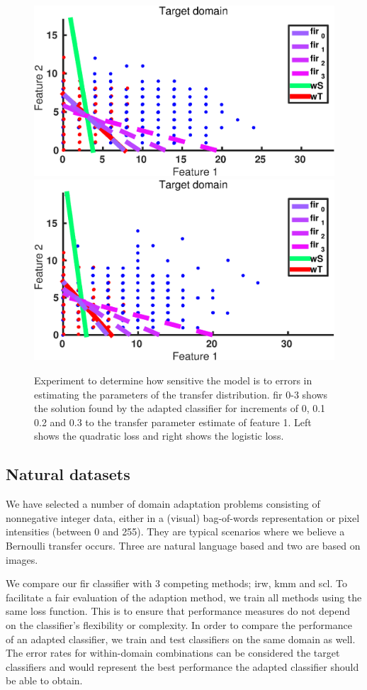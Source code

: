 \documentclass[twoside,11pt]{article}
\begin{document}
\begin{figure}[ht]
	\centering
	\includegraphics[width=.45\textwidth]{images/da_artexp_sens_params_square.eps} \hspace{5px}
	\includegraphics[width=.45\textwidth]{images/da_artexp_sens_params_log.eps} 
	\caption{Experiment to determine how sensitive the model is to errors in estimating the parameters of the transfer distribution. {\sc fir} 0-3 shows the solution found by the adapted classifier for increments of 0, 0.1 0.2 and 0.3 to the transfer parameter estimate of feature 1. Left shows the quadratic loss and right shows the logistic loss.}
	\label{sens_params}
\end{figure}

\subsection{Natural datasets}
We have selected a number of domain adaptation problems consisting of nonnegative integer data, either in a (visual) bag-of-words representation or pixel intensities (between 0 and 255). They are typical scenarios where we believe a Bernoulli transfer occurs. Three are natural language based and two are based on images.

We compare our {\sc fir} classifier with 3 competing methods; {\sc irw}, {\sc kmm} and {\sc scl}. To facilitate a fair evaluation of the adaption method, we train all methods using the same loss function. This is to ensure that performance measures do not depend on the classifier's flexibility or complexity. In order to compare the performance of an adapted classifier, we train and test classifiers on the same domain as well. The error rates for within-domain combinations can be considered the target classifiers and would represent the best performance the adapted classifier should be able to obtain.
\end{document}
